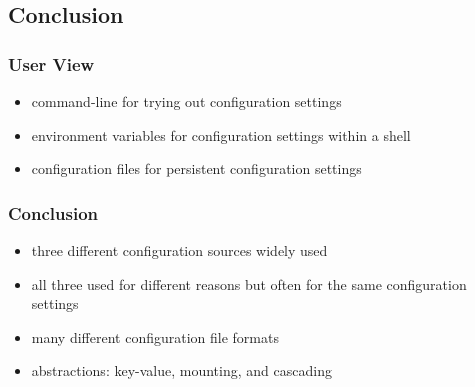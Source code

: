 \documentclass{beamer}
\begin{document}
\subsection{Conclusion}

\begin{frame}
	\frametitle{User View}
	\begin{itemize}
	\item command-line for trying out configuration settings
	\item environment variables for configuration settings within a shell
	\item configuration files for persistent configuration settings
	\end{itemize}
\end{frame}

\begin{frame}
	\frametitle{Conclusion}
	\begin{itemize}
	\item three different configuration sources widely used
	\item all three used for different reasons but often for the same configuration settings
	\item many different configuration file formats
	\item abstractions: key-value, mounting, and cascading
	\end{itemize}
\end{frame}



\nocite{raab2017introducing}

\appendix

\begin{frame}[allowframebreaks]
	
	
\end{frame}
\end{document}
